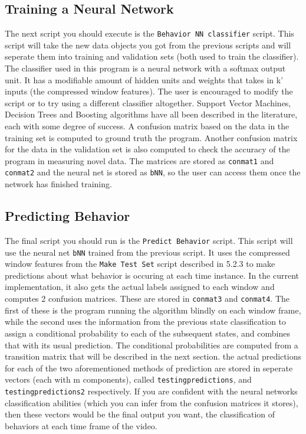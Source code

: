 \documentclass[12pt,titlepage]{report}
\begin{document}
\subsection{Training a Neural Network}
The next script you should execute is the \texttt{Behavior NN classifier} script. This script will take the new data objects you got from the previous scripts and will seperate them into training and validation sets (both used to train the classifier). The classifier used in this program is a neural network with a softmax output unit. It has a modifiable amount of hidden units and weights that takes in k' inputs (the compressed window features). The user is encouraged to modify the script or to try using a different classifier altogether. Support Vector Machines, Decision Trees and Boosting algorithms have all been described in the literature, each with some degree of success. A confusion matrix based on the data in the training set is computed to ground truth the program. Another confusion matrix for the data in the validation set is also computed to check the accuracy of the program in measuring novel data. The matrices are stored as \texttt{conmat1} and \texttt{conmat2} and the neural net is stored as \texttt{bNN}, so the user can access them once the network has finished training.

\subsection{Predicting Behavior}
The final script you should run is the \texttt{Predict Behavior} script. This script will use the neural net \texttt{bNN} trained from the previous script. It uses the compressed window features from the \texttt{Make Test Set} script described in 5.2.3 to make predictions about what behavior is occuring at each time instance. In the current implementation, it also gets the actual labels assigned to each window and computes 2 confusion matrices. These are stored in \texttt{conmat3} and \texttt{conmat4}. The first of these is the program running the algorithm blindly on each window frame, while the second uses the information from the previous state classification to assign a conditional probability to each of the subsequent states, and combines that with its usual prediction.
The conditional probabilities are computed from a transition matrix that will be described in the next section. the actual predictions for each of the two aforementioned methods of prediction are stored in seperate vectors (each with m components), called \texttt{testingpredictions}, and \texttt{testingpredictions2} respectively. If you are confident with the neural networks classification abilities (which you can infer from the confusion matrices it stores), then these vectors would be the final output you want, the classification of behaviors at each time frame of the video.
\end{document}
